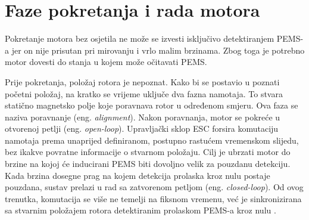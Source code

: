 \documentclass[diplomskirad]{fer}
\begin{document}
\newpage

\section{Faze pokretanja i rada motora}
\label{sec:pokretanje}

Pokretanje motora bez osjetila ne može se izvesti isključivo detektiranjem
PEMS-a jer on nije prisutan pri mirovanju i vrlo malim brzinama. Zbog toga je
potrebno motor dovesti do stanja u kojem može očitavati PEMS.

Prije pokretanja, položaj rotora je nepoznat. Kako bi se postavio u poznati
početni položaj, na kratko se vrijeme uključe dva fazna namotaja. To stvara
statično magnetsko polje koje poravnava rotor u određenom smjeru. Ova faza se
naziva poravnanje (eng. \textit{alignment}). Nakon poravnanja, motor se pokreće
u otvorenoj petlji (eng. \textit{open-loop}). Upravljački sklop ESC forsira
komutaciju namotaja prema unaprijed definiranom, postupno rastućem vremenskom
slijedu, bez ikakve povratne informacije o stvarnom položaju. Cilj je ubrzati
motor do brzine na kojoj će inducirani PEMS biti dovoljno velik za pouzdanu
detekciju. Kada brzina dosegne prag na kojem detekcija prolaska kroz nulu
postaje pouzdana, sustav prelazi u rad sa zatvorenom petljom (eng.
\textit{closed-loop}). Od ovog trenutka, komutacija se više ne temelji na
fiksnom vremenu, već je sinkronizirana sa stvarnim položajem rotora
detektiranim prolaskom PEMS-a kroz nulu \cite{Recasens2021}.
\end{document}
